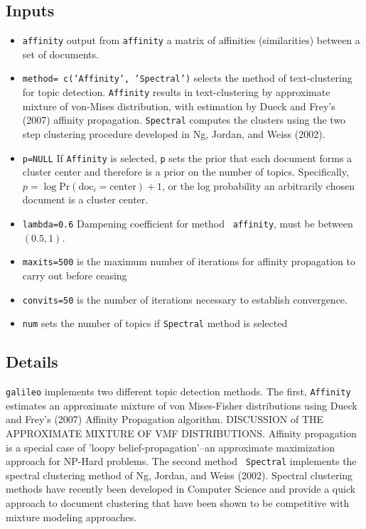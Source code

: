 \documentclass[12pt,letterpaper]{article}
\begin{document}
\subsection*{Inputs}
\begin{itemize}
\item{{\tt affinity}} output from {\tt affinity} a matrix of
affinities (similarities) between a set of documents.
\item{{\tt method= c('Affinity', 'Spectral')}} selects the method of
text-clustering for topic detection.  {\tt Affinity} results in
text-clustering by approximate mixture of von-Mises distribution,
with estimation by Dueck and Frey's (2007) affinity propagation.
{\tt Spectral} computes the clusters using the two step clustering
procedure developed in Ng, Jordan, and Weiss (2002).
\item{{\tt p=NULL}} If {\tt Affinity} is selected, {\tt p} sets the
prior that each document forms a cluster center and therefore is a
prior on the number of topics.  Specifically, $p = \log
\text{Pr}(\text{doc}_i = \text{center}) + 1$, or the log probability
an arbitrarily chosen document is a cluster center.
\item{{\tt lambda=0.6}} Dampening coefficient for method {\tt
affinity}, must be between $(0.5,1)$.
\item{{\tt maxits=500}} is the maximum number of iterations for
affinity propagation to carry out before ceasing
\item{{\tt convits=50}} is the number of iterations necessary to
establish convergence.
\item{{\tt num}} sets the number of topics if {\tt Spectral} method
is selected
\end{itemize}

\subsection*{Details} {\tt galileo} implements two different topic
detection methods. The first, {\tt Affinity} estimates an
approximate mixture of von Mises-Fisher distributions using Dueck
and Frey's (2007) Affinity Propagation algorithm.  DISCUSSION of THE
APPROXIMATE MIXTURE OF VMF DISTRIBUTIONS.  Affinity propagation is a
special case of 'loopy belief-propagation'--an approximate
maximization approach for NP-Hard problems. The second method {\tt
Spectral} implements the spectral clustering method of Ng, Jordan,
and Weiss (2002). Spectral clustering methods have recently been
developed in Computer Science and provide a quick approach to
document clustering that have been shown to be competitive with
mixture modeling approaches.
\end{document}

